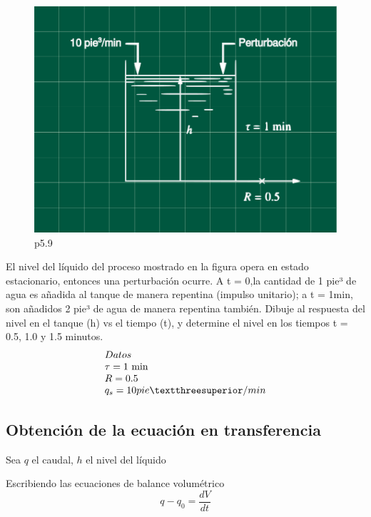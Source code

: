 \documentclass[
  letterpaper,
  DIV=11,
  numbers=noendperiod]{scrreprt}
\begin{document}
\begin{figure}

{\centering \includegraphics{././images/p5.9-coughanowr/control1.png}

}

\caption{p5.9}

\end{figure}

El nivel del líquido del proceso mostrado en la figura opera en estado
estacionario, entonces una perturbación ocurre. A t = 0,la cantidad de 1
pie³ de agua es añadida al tanque de manera repentina (impulso
unitario); a t = 1min, son añadidos 2 pie³ de agua de manera repentina
también. Dibuje al respuesta del nivel en el tanque (h) vs el tiempo
(t), y determine el nivel en los tiempos t = 0.5, 1.0 y 1.5 minutos. \[
\begin{array}{l}
Datos\\
\tau = 1\text{ min}\\
R = 0.5\\
q_s = 10\space pie³/min
\end{array}
\]

\hypertarget{obtenciuxf3n-de-la-ecuaciuxf3n-en-transferencia}{%
\subsection{Obtención de la ecuación en
transferencia}\label{obtenciuxf3n-de-la-ecuaciuxf3n-en-transferencia}}

Sea \(q\) el caudal, \(h\) el nivel del líquido

Escribiendo las ecuaciones de balance volumétrico \[
q - q_0 = \frac{dV}{dt}
\]
\end{document}
